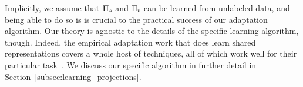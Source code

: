 Implicitly, we assume that $\Pi_s$ and $\Pi_t$ can be learned from
unlabeled data, and being able to do so is is crucial to the practical
success of our adaptation algorithm.  Our theory is agnostic to the
details of the specific learning algorithm, though.  Indeed, the
empirical adaptation work that does learn shared representations
covers a whole host of techniques, all of which work well for their
particular task~\cite{blitzer06,guo09,huangyates}.  We discuss our
specific algorithm in further detail in
Section~\ref{subsec:learning_projections}.
